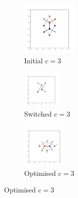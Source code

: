 \begin{figure}[bt]
     \centering
     
     \begin{subfigure}[b]{0.25\textwidth}
         \centering
         \includegraphics[height=2.6cm]{./figures/general_networks/bs_move_a.pdf}
         \caption{Initial $c=3$}
         \label{fig:bsmovea}
     \end{subfigure}
     \hfill
     \begin{subfigure}[b]{0.25\textwidth}
         \centering
         \includegraphics[height=1.8cm]{./figures/general_networks/bs_move_b.pdf}
         \caption{Switched $c=3$}
         \label{fig:bsmoveb}
     \end{subfigure}
     \hfill
     \begin{subfigure}[b]{0.25\textwidth}
         \centering
         \includegraphics[height=2.1cm]{./figures/general_networks/bs_move_c.pdf}
         \caption{Optimised $c=3$}
         \label{fig:bsmovec}
     \end{subfigure}
     

\end{figure}
